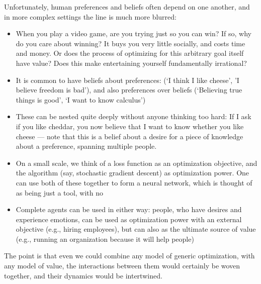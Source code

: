 \documentclass{article}
\begin{document}
	Unfortunately, human preferences and beliefs often depend on one another, and in more complex settings the line is much more blurred:
	\begin{itemize}[nosep]
		\item When you play a video game, are you trying just so you can win? If so, why do you care about winning? It buys you very little socially, and costs time and money. Or does the process of optimizing for this arbitrary goal itself have value? Does this make entertaining yourself fundamentally irrational?
		\item It is common to have beliefs about preferences: (`I think I like cheese', 'I believe freedom is bad'), and also preferences over beliefs (`Believing true things is good', `I want to know calculus')
		\item These can be nested quite deeply without anyone thinking too hard: If I ask if you like cheddar, you now believe that I want to know whether you like cheese --- note that this is a belief about a desire for a piece of knowledge about a preference, spanning multiple people.

		\item On a small scale, we think of a loss function as an optimization objective, and the algorithm (say, stochastic gradient descent) as optimization power. One can use both of these together to form a neural network, which is thought of as being just a tool, with no

		\item Complete agents can be used in either way: people, who have desires and experience emotions, can be used as optimization power with an external objective (e.g., hiring employees), but can also as the ultimate source of value (e.g., running an organization because it will help people)
	\end{itemize}
	The point is that even we could combine any model of generic optimization, with any model of value, the interactions between them would certainly be woven together, and their dynamics would be intertwined.
	
\end{document}

